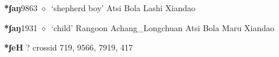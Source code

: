   \begin{list}{}{\leftmargin=1.5em \itemindent=-1.5em}
  \item {\footnotesize \textbf{*ʃaŋ}}{\tiny 9863}
         $\diamond$~`shepherd boy'
         Atsi 
\hspace{1ex}
         Bola 
\hspace{1ex}
         Lashi 
\hspace{1ex}
         Xiandao 
  \item {\footnotesize \textbf{*ʃaŋ}}{\tiny 1931}
\hspace{1ex}
         $\diamond$~`child'
         Rangoon 
\hspace{1ex}
         Achang\_Longchuan 
\hspace{1ex}
         Atsi 
\hspace{1ex}
         Bola 
\hspace{1ex}
         Maru 
\hspace{1ex}
         Xiandao 
  \end{list}
\item
\textbf{*ʃeH}
?
  {\tiny crossid 719, 9566, 7919, 417}
